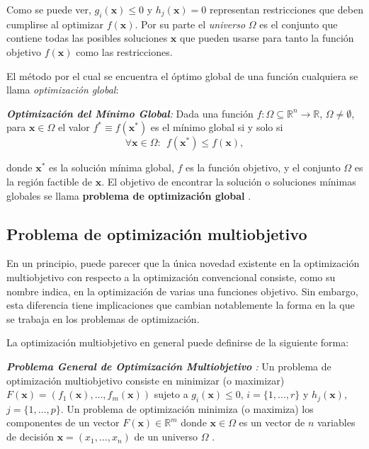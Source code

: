	
Como se puede ver, $g_i(\textbf{x}) \leq 0$ y $h_j(\textbf{x}) = 0$ representan restricciones que deben cumplirse al optimizar $f(\textbf{x})$. Por su parte el \emph{universo} $\Omega$ es el conjunto que contiene todas las posibles soluciones $\textbf{x}$ que pueden usarse para tanto la función objetivo $f(\textbf{x})$  como las restricciones.
	
El método por el cual se encuentra el óptimo global de una función cualquiera se llama \emph{optimización global}: 
	
\begin{definicion}
 \emph{\textbf{Optimización del Mínimo Global}:} Dada una función $f:\Omega \subseteq \mathbb{R}^n \rightarrow \mathbb{R}$, $\Omega \neq \emptyset$, para $\textbf{x} \in \Omega$ el valor $f^* \equiv f(\textbf{x}^*)$ es el mínimo global si y solo si
 \begin{equation}
 	\forall \textbf{x} \in \Omega:~~f(\textbf{x}^*) \leq f(\textbf{x}),
 \end{equation}
 
 donde $\textbf{x}^*$ es la solución mínima global, $f$ es la función objetivo, y el conjunto $\Omega$ es la región factible de $\textbf{x}$. El objetivo de encontrar la solución o soluciones mínimas globales se llama \textbf{problema de optimización global} \cite{coello2007evolutionary}.
\end{definicion}	



\subsection{Problema de optimización multiobjetivo}\label{sec:mop}

En un principio, puede parecer que la única novedad existente en la optimización multiobjetivo con respecto a la optimización convencional consiste, como su nombre indica, en la optimización de varias una funciones objetivo. Sin embargo, esta diferencia tiene implicaciones que cambian notablemente la forma en la que se trabaja en los problemas de optimización.

La optimización multiobjetivo en general puede definirse de la siguiente forma:

\begin{definicion}
	
	\emph{\textbf{Problema General de Optimización  Multiobjetivo} :} Un problema de optimización multiobjetivo consiste en minimizar (o maximizar) $F(\textbf{x}) = (f_1(\textbf{x}),\dots,f_m(\textbf{x}))$ sujeto a $g_i(\textbf{x}) \leq 0$, $i = \{1, \dots, r\}$ y $h_j(\textbf{x})$, $j = \{ 1, \dots, p\}$. Un problema de optimización minimiza (o maximiza) los componentes de un vector $F(\textbf{x}) \in \mathbb{R}^m$ donde $\textbf{x} \in \Omega$ es un vector de $n$ variables de decisión $\textbf{x} = (x_1, \dots, x_n)$ de un universo $\Omega$ \cite{coello2007evolutionary}.
\end{definicion}

